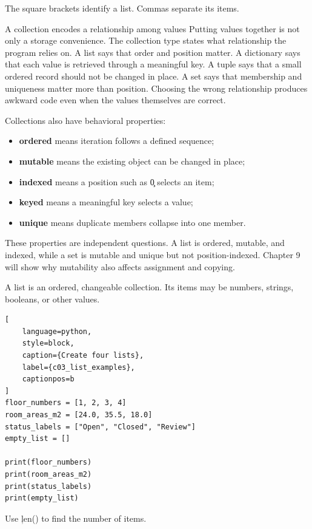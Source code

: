 The square brackets identify a list. Commas separate its items.

\begin{ExplainBox}{A collection encodes a relationship among values}
Putting values together is not only a storage convenience. The collection
type states what relationship the program relies on. A list says that order
and position matter. A dictionary says that each value is retrieved through a
meaningful key. A tuple says that a small ordered record should not be changed
in place. A set says that membership and uniqueness matter more than position.
Choosing the wrong relationship produces awkward code even when the values
themselves are correct.
\end{ExplainBox}

Collections also have behavioral properties:
\begin{itemize}
    \item \textbf{ordered} means iteration follows a defined sequence;
    \item \textbf{mutable} means the existing object can be changed in place;
    \item \textbf{indexed} means a position such as \c{0} selects an item;
    \item \textbf{keyed} means a meaningful key selects a value;
    \item \textbf{unique} means duplicate members collapse into one member.
\end{itemize}

These properties are independent questions. A list is ordered, mutable, and
indexed, while a set is mutable and unique but not position-indexed. Chapter 9
will show why mutability also affects assignment and copying.


A list is an ordered, changeable collection. Its items may be numbers, strings,
booleans, or other values.

\begin{lstlisting}[
    language=python,
    style=block,
    caption={Create four lists},
    label={c03_list_examples},
    captionpos=b
]
floor_numbers = [1, 2, 3, 4]
room_areas_m2 = [24.0, 35.5, 18.0]
status_labels = ["Open", "Closed", "Review"]
empty_list = []

print(floor_numbers)
print(room_areas_m2)
print(status_labels)
print(empty_list)
\end{lstlisting}

Use \c{len()} to find the number of items.

